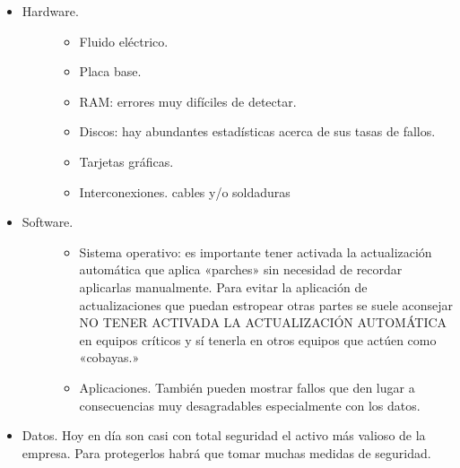 \documentclass[letterpaper,10pt,spanish]{sphinxmanual}
\begin{document}
\begin{itemize}
\item {} \begin{description}
\item[{Hardware.}] \leavevmode\begin{itemize}
\item {} 
Fluido eléctrico.

\item {} 
Placa base.

\item {} 
RAM: errores muy difíciles de detectar.

\item {} 
Discos: hay abundantes estadísticas acerca de sus tasas de fallos.

\item {} 
Tarjetas gráficas.

\item {} 
Interconexiones. cables y/o soldaduras

\end{itemize}

\end{description}

\item {} \begin{description}
\item[{Software.}] \leavevmode\begin{itemize}
\item {} 
Sistema operativo: es importante tener activada la actualización automática que aplica «parches» sin necesidad de recordar aplicarlas manualmente. Para evitar la aplicación de actualizaciones que puedan estropear otras partes se suele aconsejar NO TENER ACTIVADA LA ACTUALIZACIÓN AUTOMÁTICA en equipos críticos y sí tenerla en otros equipos que actúen como «cobayas.»

\item {} 
Aplicaciones. También pueden mostrar fallos que den lugar a consecuencias muy desagradables especialmente con los datos.

\end{itemize}

\end{description}

\item {} 
Datos. Hoy en día son casi con total seguridad el activo más valioso de la empresa. Para protegerlos habrá que tomar muchas medidas de seguridad.

\end{itemize}
\end{document}
